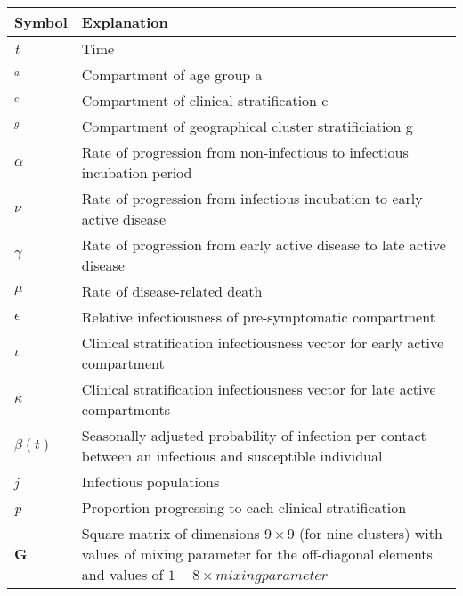 \begin{table}[ht]
\renewcommand{\baselinestretch}{1}
    	\begin{tabular}{| p{2cm} | p{11.1cm} |}
    	\hline
    		Symbol & Explanation \\
    		\hline
    		\textit{t} & Time  \\
    		$_{\textit{a}}$ & Compartment of age group a \\
    		$_{\textit{c}}$ & Compartment of clinical stratification c \\
    		$_{\textit{g}}$ & Compartment of geographical cluster stratificiation g \\
    		$\alpha$ & Rate of progression from non-infectious to infectious incubation period \\
    		$\nu$ & Rate of progression from infectious incubation to early active disease \\
    		$\gamma$ & Rate of progression from early active disease to late active disease \\
    		$\mu$ & Rate of disease-related death \\
    		$\epsilon$ & Relative infectiousness of pre-symptomatic compartment \\
    		$\iota$ & Clinical stratification infectiousness vector for early active compartment \\
    		$\kappa$ & Clinical stratification infectiousness vector for late active compartments \\
    		$\beta(t)$ & Seasonally adjusted probability of infection per contact between an infectious and susceptible individual \\
	    	\textit{j} & Infectious populations \\
    		\textit{p} & Proportion progressing to each clinical stratification \\
    		\textbf{G} & Square matrix of dimensions \(9 \times 9\) (for nine clusters) with values of mixing parameter for the off-diagonal elements and values of \(1-8\times mixing parameter\) \\
    \hline
	\end{tabular}
\end{table}


